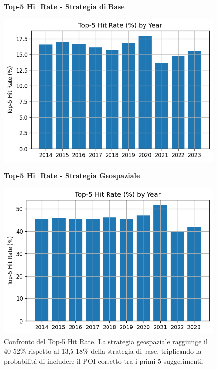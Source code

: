 \begin{figure}[htbp]
\centering
\begin{minipage}{0.48\textwidth}
\centering
\textbf{Top-5 Hit Rate - Strategia di Base}\par
\vspace{0.3em}
\includegraphics[width=\textwidth]{../../img/llama3.1_8b/no_SPACE-GEO_n-1_come_current_POI/top5_hit_rate.png}
\end{minipage}
\hfill
\begin{minipage}{0.48\textwidth}
\centering
\textbf{Top-5 Hit Rate - Strategia Geospaziale}\par
\vspace{0.3em}
\includegraphics[width=\textwidth]{../../img/llama3.1_8b/SPACE-GEO_n-1_come_current_POI/top_5_hit_rate.png}
\end{minipage}
\caption{Confronto del Top-5 Hit Rate. La strategia geospaziale raggiunge il 40-52\% rispetto al 13,5-18\% della strategia di base, triplicando la probabilità di includere il POI corretto tra i primi 5 suggerimenti.}
\label{fig:top5_comparison}
\end{figure}

